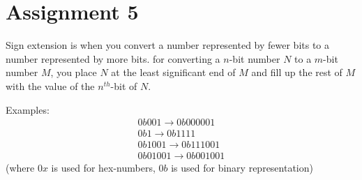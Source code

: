 \section{Assignment 5}
Sign extension is when you convert a number represented by fewer bits to a
number represented by more bits. for converting a $n$-bit number $N$ to a $m$-bit
number $M$, you place $N$ at the least significant end of $M$ and fill up the
rest of $M$ with the value of the $n^{th}$-bit of $N$.

Examples:
\begin{gather*}
0b001 \rightarrow 0b000001\\
0b1 \rightarrow 0b1111\\
0b1001 \rightarrow 0b111001\\
0b01001 \rightarrow 0b001001
\end{gather*}
(where $0x$ is used for hex-numbers, $0b$ is used for binary representation)